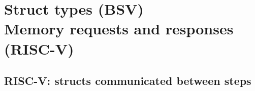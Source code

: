 

\chapter{Struct types {\large (BSV)}\\
Memory requests and responses {\large (RISC-V)}}


\setcounter{page}{1}
\renewcommand{\thepage}{\arabic{chapter}-\arabic{page}}

\label{ch_Structs_Mem_Reqs_Rsps}


\section{RISC-V: structs communicated between steps}


